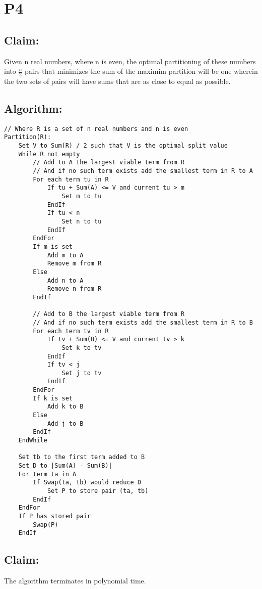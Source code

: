 \documentclass[11pt]{article}
\title{}
\author{}
\date{}
\begin{document}
\section*{P4}

\subsection*{Claim:} 
Given n real numbers, where n is even, the optimal partitioning of these numbers into $\frac{n}{2}$ pairs that minimizes the sum of the maximim partition will be one wherein the two sets of pairs will have sums that are as close to equal as possible. 

\subsection*{Algorithm:} 
\begin{lstlisting}[basicstyle=\small]
// Where R is a set of n real numbers and n is even
Partition(R):
	Set V to Sum(R) / 2 such that V is the optimal split value
	While R not empty
		// Add to A the largest viable term from R
		// And if no such term exists add the smallest term in R to A
		For each term tu in R
			If tu + Sum(A) <= V and current tu > m
				Set m to tu
			EndIf
			If tu < n
				Set n to tu
			EndIf
		EndFor
		If m is set
			Add m to A
			Remove m from R
		Else
			Add n to A
			Remove n from R
		EndIf
		
		// Add to B the largest viable term from R
		// And if no such term exists add the smallest term in R to B
		For each term tv in R
			If tv + Sum(B) <= V and current tv > k
				Set k to tv
			EndIf
			If tv < j
				Set j to tv
			EndIf
		EndFor
		If k is set
			Add k to B
		Else
			Add j to B
		EndIf
	EndWhile
	
	Set tb to the first term added to B
	Set D to |Sum(A) - Sum(B)|
	For term ta in A
		If Swap(ta, tb) would reduce D
			Set P to store pair (ta, tb)
		EndIf
	EndFor
	If P has stored pair
		Swap(P)
	EndIf
\end{lstlisting}

\subsection*{Claim:} 
The algorithm terminates in polynomial time.
\end{document}

